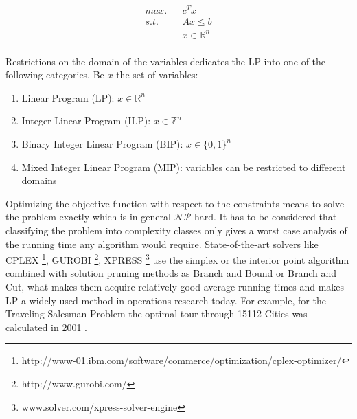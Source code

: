 \begin{equation*}
\begin{aligned}
max. && c^Tx            \\
s.t. && Ax \leq b       \\
&& x \in \mathbb{R}^n \\
\end{aligned}
\end{equation*}

%

Restrictions on the domain of the variables dedicates the LP into one of the following categories. Be $x$ the set of variables:
\begin{enumerate}
\item Linear Program (LP): $x \in \mathbb{R}^n$
\item Integer Linear Program (ILP): $x \in \mathbb{Z}^n$
\item Binary Integer Linear Program (BIP): $x \in \{0,1\}^n$
\item Mixed Integer Linear Program (MIP): variables can be restricted to different domains
\end{enumerate}

Optimizing the objective function with respect to the constraints means to solve the problem exactly which is in general $\mathcal{NP}$-hard. It has to be considered that classifying the problem into complexity classes only gives a worst case analysis of the running time any algorithm would require. State-of-the-art solvers like CPLEX \footnote{http://www-01.ibm.com/software/commerce/optimization/cplex-optimizer/}, GUROBI \footnote{http://www.gurobi.com/}, XPRESS \footnote{www.solver.com/xpress-solver-engine} use the simplex or the interior point algorithm combined with solution pruning methods as Branch and Bound or Branch and Cut, what makes them acquire relatively good average running times and makes LP a widely used method in operations research today. For example, for the Traveling Salesman Problem the optimal tour through 15112 Cities was calculated in 2001 \cite{applegate-01}.
